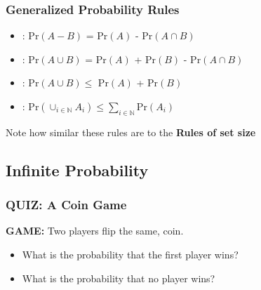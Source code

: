 \documentclass{beamer}
\begin{document}
\begin{frame}
  \frametitle{Generalized Probability Rules}

  {\large
    \begin{itemize}
    \item {}: Pr$(A-B)$ = Pr$(A)$ - Pr$(A \cap B)$
      \bigskip
      
    \item<2-> : Pr$(A\cup B)$ = Pr$(A)$ + Pr$(B)$ - Pr$(A\cap B)$
      \bigskip

    \item<3-> : Pr$(A\cup B) \leq$ Pr$(A)$ + Pr$(B)$
      \bigskip
      
    \item<4-> :
      $\text{Pr}(\cup_{i\in\mathbb{N}}A_i) \leq
      \sum_{i\in\mathbb{N}}\text{Pr}(A_i)$

      
    \end{itemize}

    \vfill
    
    Note how similar these rules are to the {\bf Rules of set size}
  }  
\end{frame}

\subsection{Infinite Probability}

\begin{frame}
  \frametitle{QUIZ: A Coin Game}

  {\large
    {\bf GAME:} Two players flip the same,  coin.

    \bigskip
    
    \begin{itemize}
    \item What is the
      probability that the \alert{first player wins}?
      \bigskip
      
    \item What is the probability that no player wins?
    \end{itemize}

  }
\end{frame}
\end{document}

